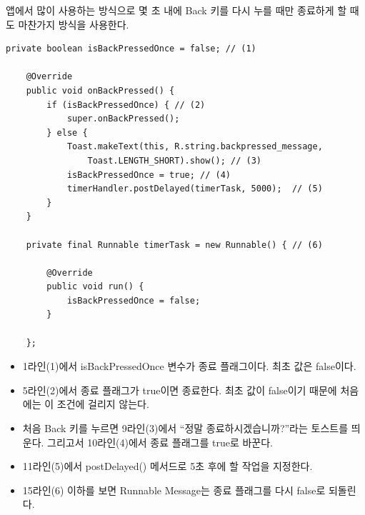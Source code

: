 \begin{itemize}
앱에서 많이 사용하는 방식으로 몇 초 내에 Back 키를 다시 누를 때만 종료하게 할 때도 마찬가지 방식을 사용한다.
\begin{lstlisting}[frame=single] 
	private boolean isBackPressedOnce = false; // (1)
	
	@Override
	public void onBackPressed() {
		if (isBackPressedOnce) { // (2)
			super.onBackPressed();
		} else {
			Toast.makeText(this, R.string.backpressed_message,
				Toast.LENGTH_SHORT).show(); // (3)
			isBackPressedOnce = true; // (4)
			timerHandler.postDelayed(timerTask, 5000);	// (5)		
		}
	}
	
	private final Runnable timerTask = new Runnable() { // (6)
		
		@Override
		public void run() {
			isBackPressedOnce = false;
		}
		
    };
\end{lstlisting}
\begin{itemize}
\item 1라인(1)에서 isBackPressedOnce 변수가 종료 플래그이다. 최초 값은 false이다.
\item 5라인(2)에서 종료 플래그가 true이면 종료한다. 최초 값이 false이기 때문에 처음에는 이 조건에 걸리지 않는다.
\item 처음 Back 키를 누르면 9라인(3)에서 ``정말 종료하시겠습니까?''라는 토스트를 띄운다. 그리고서 10라인(4)에서 종료 플래그를 true로 바꾼다.
\item 11라인(5)에서 postDelayed() 메서드로 5초 후에 할 작업을 지정한다.
\item 15라인(6) 이하를 보면 Runnable Message는 종료 플래그를 다시 false로 되돌린다.
\end{itemize}

\end{itemize}

